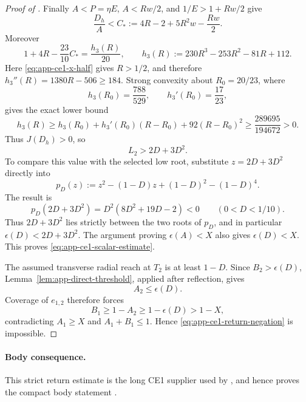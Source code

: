 \begin{proof}[Proof of ]
Finally $A<P=\eta E$, $A<Rw/2$, and $1/E>1+Rw/2$ give
\[
 \frac{D_h}{A}
 <C_*:=4R-2+5R^2w-\frac{Rw}{2}.
\]
Moreover
\[
 1+4R-\frac{23}{10}C_*
 =\frac{h_3(R)}{20},
 \qquad
 h_3(R):=230R^3-253R^2-81R+112.
\]
Here \eqref{eq:app-ce1-x-half} gives $R>1/2$, and therefore
$h_3''(R)=1380R-506\ge184$.  Strong convexity about
$R_0=20/23$, where
\[
 h_3(R_0)=\frac{788}{529},
 \qquad
 h_3'(R_0)=\frac{17}{23},
\]
gives the exact lower bound
\[
 h_3(R)
 \ge h_3(R_0)+h_3'(R_0)(R-R_0)+92(R-R_0)^2
 \ge\frac{289695}{194672}>0.
\]
Thus $J(D_h)>0$, so
\[
 L_2>2D+3D^2.
\]
To compare this value with the selected low root, substitute
$z=2D+3D^2$ directly into
\[
 p_D(z):=z^2-(1-D)z+(1-D)^2-(1-D)^4.
\]
The result is
\[
 p_D(2D+3D^2)=D^2(8D^2+19D-2)<0
 \qquad(0<D<1/10).
\]
Thus $2D+3D^2$ lies strictly between the two roots of $p_D$, and in
particular $\epsilon(D)<2D+3D^2$.  The argument proving
$\epsilon(A)<X$ also gives $\epsilon(D)<X$.  This proves
\eqref{eq:app-ce1-scalar-estimate}.

The assumed transverse radial reach at $T_2$ is at least $1-D$.  Since
$B_2>\epsilon(D)$, Lemma~\ref{lem:app-direct-threshold}, applied after
reflection, gives
\[
 A_2\le\epsilon(D).
\]
Coverage of $e_{1,2}$ therefore forces
\[
 B_1\ge1-A_2\ge1-\epsilon(D)>1-X,
\]
contradicting $A_1\ge X$ and $A_1+B_1\le1$.  Hence
\eqref{eq:app-ce1-return-negation} is impossible.
\end{proof}

\paragraph{Body consequence.}
This strict return estimate is the long CE1 supplier used by
, and hence proves the compact body
statement .
